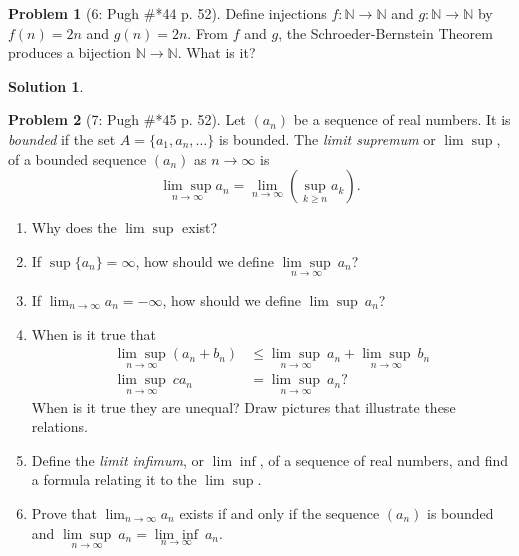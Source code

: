\documentclass{article}
\theoremstyle{definition}
\newtheorem*{soln}{Solution}
\newtheorem*{prob}{Problem}
\theoremstyle{theorem}
\newcommand{\N}{\mathbb{N}}
\begin{document}
\begin{prob}[6: Pugh \#*44 p. 52]
Define injections $f: \N \to \N$ and $g: \N \to \N$ by $f(n) = 2n$ and $g(n) = 2n$. From $f$ and $g$, the Schroeder-Bernstein Theorem produces a bijection $\N \to \N$. What is it? 
\end{prob}
\begin{soln}

\end{soln}
\vspace{1in}

\begin{prob}[7: Pugh \#*45 p. 52]
Let $(a_n)$ be a sequence of real numbers. It is \emph{bounded} if the set $A = \{a_1,a_n,\ldots \}$ is bounded. The \emph{limit supremum} or $\lim \sup$, of a bounded sequence $(a_n)$ as $n \to \infty$ is $$\underset{n \to \infty}{\lim \sup} a_n = \lim_{n \to \infty} \left( \sup_{k \geq n} a_k \right).$$
\begin{enumerate}
    \item Why does the $\lim \sup$ exist?
    \item If $\sup \{a_n\} = \infty$, how should we define $\underset{n \to \infty}{\lim \sup}\ a_n$?
    \item If $\lim_{n \to \infty} a_n = -\infty$, how should we define $\lim \sup \ a_n$?
    \item When is it true that
    \begin{align*}
        \underset{n \to \infty}{\lim \sup} (a_n + b_n) & \leq \underset{n \to \infty}{\lim \sup}\  a_n + \underset{n \to \infty}{\lim \sup}\ b_n\\
        \underset{n \to \infty}{\lim \sup}\  ca_n & = \underset{n \to \infty}{\lim \sup} \ a_n?
    \end{align*}
    When is it true they are unequal? Draw pictures that illustrate these relations.
    \item Define the \emph{limit infimum}, or $\lim \inf$, of a sequence of real numbers, and find a formula relating it to the $\lim \sup$.
    \item Prove that $\lim_{n \to \infty} a_n$ exists if and only if the sequence $(a_n)$ is bounded and $\underset{n \to \infty}{\lim \sup}\ a_n = \underset{n \to \infty}{\lim \inf}\ a_n.$
\end{enumerate}
\end{prob}
\end{document}
